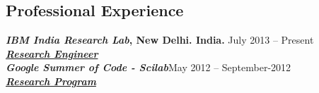 \documentclass[margin,line]{res}
\begin{document}
\begin{resume}
\section{\sc Professional Experience}
{\bf {\em IBM India Research Lab}, New Delhi. India.} \hfill{July 2013 -- Present}\\
\href{http://researcher.ibm.com/researcher/view.php?person=in-mapallan}{\em {\bf Research Engineer}}
\vspace{2.0 mm}\\
{\bf{\em Google Summer of Code - Scilab}}\hfill {May 2012 -- September-2012}\\
\href{https://research.google.com/university/student-support/}{\em {\bf Research Program}}
%
\vspace{0.01 mm}

\end{resume}
\end{document}
